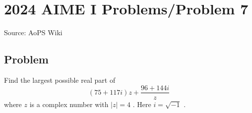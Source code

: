 \documentclass[12pt]{article}
\begin{document}
\section*{{2024 AIME I Problems/Problem 7}}
Source: AoPS Wiki

\subsection*{Problem}
Find the largest possible real part of \[(75+117i)z+\frac{96+144i}{z}\] where $z$ is a complex number with $|z|=4$ . Here $i = \sqrt{-1}$ .
\end{document}
